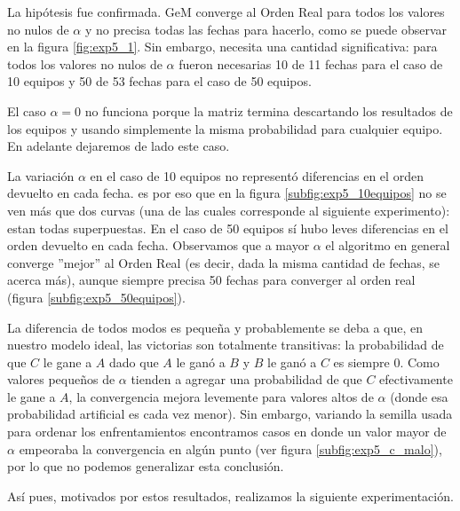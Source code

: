 \par La hip\'otesis fue confirmada. GeM converge al Orden Real para todos los
valores no nulos de $\alpha$ y no precisa todas las fechas para hacerlo, como se
puede observar en la figura \ref{fig:exp5_1}. Sin embargo, necesita una cantidad
significativa: para todos los valores no nulos de $\alpha$ fueron necesarias 10
de 11 fechas para el caso de 10 equipos y 50 de 53 fechas para el caso de 50
equipos.

\par El caso $\alpha=0$ no funciona porque la matriz termina descartando los
resultados de los equipos y usando simplemente la misma probabilidad para
cualquier equipo. En adelante dejaremos de lado este caso.

\par La variaci\'on $\alpha$ en el caso de 10 equipos no represent\'o
diferencias en el orden devuelto en cada fecha. es por eso que en la figura
\ref{subfig:exp5_10equipos} no se ven m\'as que dos curvas (una de las cuales
corresponde al siguiente experimento): estan todas superpuestas. En el caso de
50 equipos s\'i hubo leves diferencias en el orden devuelto en cada fecha.
Observamos que a mayor $\alpha$ el algoritmo en general converge ''mejor'' al
Orden Real (es decir, dada la misma cantidad de fechas, se acerca m\'as), aunque
siempre precisa 50 fechas para converger al orden real (figura
\ref{subfig:exp5_50equipos}).

\par La diferencia de todos modos es peque\~na y probablemente se deba a que, en
nuestro modelo ideal, las victorias son totalmente transitivas: la probabilidad
de que $C$ le gane a $A$ dado que $A$ le gan\'o a $B$ y $B$ le ganó a $C$ es
siempre $0$.  Como valores peque\~nos de $\alpha$ tienden a agregar una
probabilidad de que $C$ efectivamente le gane a $A$, la convergencia mejora
levemente para valores altos de $\alpha$ (donde esa probabilidad artificial es
cada vez menor). Sin embargo, variando la semilla usada para ordenar los
enfrentamientos encontramos casos en donde un valor mayor de $\alpha$ empeoraba
la convergencia en alg\'un punto (ver figura \ref{subfig:exp5_c_malo}), por lo
que no podemos generalizar esta conclusi\'on.

\par As\'i pues, motivados por estos resultados, realizamos la siguiente
experimentaci\'on.


